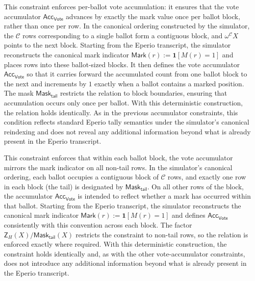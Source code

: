This constraint enforces per-ballot vote accumulation: it ensures that the vote accumulator
$\mathsf{Acc}_{\mathsf{Vote}}$ advances by exactly the mark value once per ballot block, rather than once per row. In the
canonical ordering constructed by the simulator, the $\mathcal{C}$ rows corresponding to a single ballot form a
contiguous block, and $\omega^{\mathcal{C}}X$ points to the next block. Starting from the Eperio transcript, the simulator
reconstructs the canonical mark indicator $\mathsf{Mark}(r):=\mathbf{1}[M(r)=1]$ and places rows into these ballot-sized
blocks. It then defines the vote accumulator $\mathsf{Acc}_{\mathsf{Vote}}$ so that it carries forward the accumulated
count from one ballot block to the next and increments by $1$ exactly when a ballot contains a marked position. The mask
$\mathsf{Mask}_{\mathsf{tail}}$ restricts the relation to block boundaries, ensuring that accumulation occurs only once
per ballot. With this deterministic construction, the relation holds identically. As in the previous accumulator
constraints, this condition reflects standard Eperio tally semantics under the simulator’s canonical reindexing and does
not reveal any additional information beyond what is already present in the Eperio transcript.


This constraint enforces that within each ballot block, the vote accumulator mirrors the mark indicator on all non-tail
rows. In the simulator’s canonical ordering, each ballot occupies a contiguous block of $\mathcal{C}$ rows, and exactly
one row in each block (the tail) is designated by $\mathsf{Mask}_{\mathsf{tail}}$. On all other rows of the block, the
accumulator $\mathsf{Acc}_{\mathsf{Vote}}$ is intended to reflect whether a mark has occurred within that ballot. Starting
from the Eperio transcript, the simulator reconstructs the canonical mark indicator
$\mathsf{Mark}(r):=\mathbf{1}[M(r)=1]$ and defines $\mathsf{Acc}_{\mathsf{Vote}}$ consistently with this convention across
each block. The factor $\mathsf{Z}_H(X)/\mathsf{Mask}_{\mathsf{tail}}(X)$ restricts the constraint to non-tail rows, so the
relation is enforced exactly where required. With this deterministic construction, the constraint holds identically and,
as with the other vote-accumulator constraints, does not introduce any additional information beyond what is already
present in the Eperio transcript.

